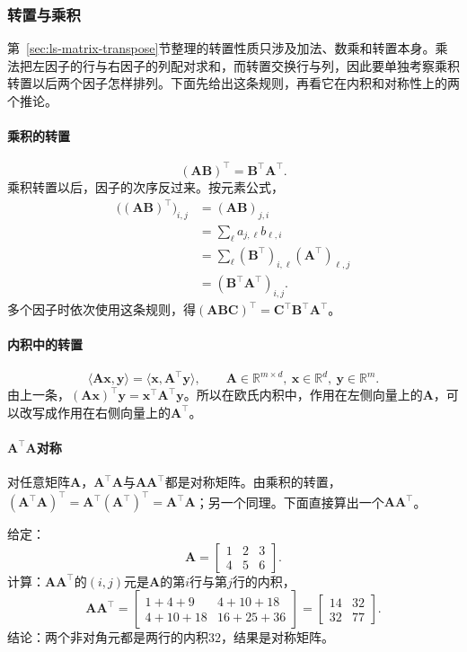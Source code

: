 \subsubsection{转置与乘积}
\label{sec:ls-reshaping}

第~\ref{sec:ls-matrix-transpose}节整理的转置性质只涉及加法、数乘和转置本身。乘法把左因子的行与右因子的列配对求和，而转置交换行与列，因此要单独考察乘积转置以后两个因子怎样排列。下面先给出这条规则，再看它在内积和对称性上的两个推论。

\paragraph{乘积的转置}
\[
 (\bm A\bm B)^\top=\bm B^\top\bm A^\top.
\]
乘积转置以后，因子的次序反过来。按元素公式，
\[
 \begin{aligned}
 \bigl((\bm A\bm B)^\top\bigr)_{i,j}
 &=(\bm A\bm B)_{j,i}\\
 &=\sum_\ell a_{j,\ell}b_{\ell,i}\\
 &=\sum_\ell(\bm B^\top)_{i,\ell}(\bm A^\top)_{\ell,j}\\
 &=(\bm B^\top\bm A^\top)_{i,j}.
 \end{aligned}
\]
多个因子时依次使用这条规则，得$(\bm A\bm B\bm C)^\top=\bm C^\top\bm B^\top\bm A^\top$。

\paragraph{内积中的转置}
\[
\langle\bm A\bm x,\bm y\rangle=\langle\bm x,\bm A^\top\bm y\rangle,\qquad
\bm A\in\mathbb R^{m\times d},\ \bm x\in\mathbb R^d,\ \bm y\in\mathbb R^m.
\]
由上一条，$(\bm A\bm x)^\top\bm y=\bm x^\top\bm A^\top\bm y$。所以在欧氏内积中，作用在左侧向量上的$\bm A$，可以改写成作用在右侧向量上的$\bm A^\top$。

\paragraph{$\bm A^\top\bm A$对称}
对任意矩阵$\bm A$，$\bm A^\top\bm A$与$\bm A\bm A^\top$都是对称矩阵。由乘积的转置，$(\bm A^\top\bm A)^\top=\bm A^\top(\bm A^\top)^\top=\bm A^\top\bm A$；另一个同理。下面直接算出一个$\bm A\bm A^\top$。
\begin{example}[计算$\bm A\bm A^\top$]
\label{ex:ls-gram-product-symmetric}
给定：
\[
 \bm A=\begin{bmatrix}1&2&3\\4&5&6\end{bmatrix}.
\]
计算：$\bm A\bm A^\top$的$(i,j)$元是$\bm A$的第$i$行与第$j$行的内积，
\[
 \bm A\bm A^\top=\begin{bmatrix}1+4+9&4+10+18\\4+10+18&16+25+36\end{bmatrix}=\begin{bmatrix}14&32\\32&77\end{bmatrix}.
\]
结论：两个非对角元都是两行的内积$32$，结果是对称矩阵。
\end{example}

